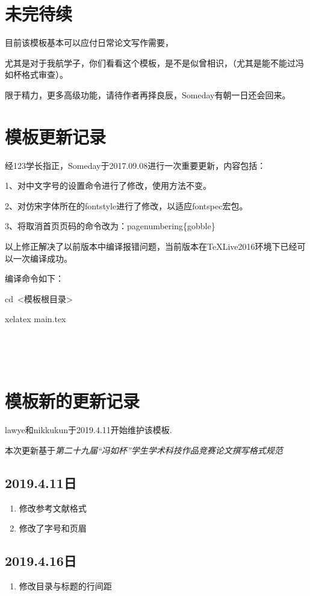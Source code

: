 \documentclass[zihao=-4]{ctexart}
\begin{document}

\clearpage

\section{未完待续}

目前该模板基本可以应付日常论文写作需要，\par
尤其是对于我航学子，你们看看这个模板，是不是似曾相识，（尤其是能不能过冯如杯格式审查）。\par
限于精力，更多高级功能，请待作者再择良辰，Someday有朝一日还会回来。

\section{模板更新记录}

经123学长指正，Someday于2017.09.08进行一次重要更新，内容包括：\par
1、对中文字号的设置命令进行了修改，使用方法不变。\par
2、对仿宋字体所在的fontstyle进行了修改，以适应fontspec宏包。\par
3、将取消首页页码的命令改为：pagenumbering\{gobble\} \par

以上修正解决了以前版本中编译报错问题，当前版本在TeXLive2016环境下已经可以一次编译成功。 \par

编译命令如下： \par
cd\ <模板根目录> \par
xelatex main.tex \par

\par \ 
\par \ 

\section{模板新的更新记录}

lawye和nikkukun于2019.4.11开始维护该模板.

本次更新基于\it{第二十九届“冯如杯”学生学术科技作品竞赛论文撰写格式规范}\cite{格式}

\subsection{2019.4.11日}
\begin{enumerate}
    \item 修改参考文献格式
    \item 修改了字号和页眉

\end{enumerate}

\subsection{2019.4.16日}
\begin{enumerate}
    \item 修改目录与标题的行间距

\end{enumerate}



\newpage
{}%


%



\end{document}
